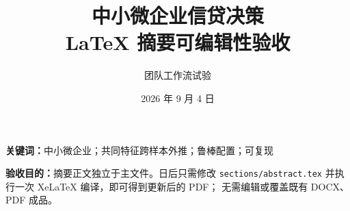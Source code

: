 \documentclass[12pt,a4paper]{ctexart}
\title{中小微企业信贷决策\\LaTeX 摘要可编辑性验收}
\author{团队工作流试验}
\date{2026 年 9 月 4 日}
\begin{document}
\maketitle

\begin{abstract}

\end{abstract}

\noindent\textbf{关键词：}中小微企业；共同特征跨样本外推；鲁棒配置；可复现

\vspace{1em}
\noindent\textbf{验收目的：}摘要正文独立于主文件。日后只需修改
\texttt{sections/abstract.tex} 并执行一次 XeLaTeX 编译，即可得到更新后的 PDF；
无需编辑或覆盖既有 DOCX、PDF 成品。
\end{document}
